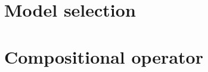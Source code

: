 \section{Model selection}
\label{sec:model-select}


\cite{kiela-clark:2014:CVSC,lapesa2014large}

\section{Compositional operator}
\label{sec:comp-oper}



